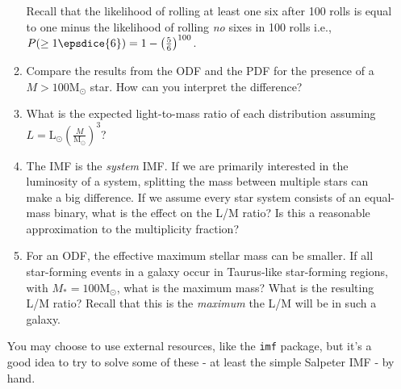 \documentclass{article}
\newcommand{\msun}{\ensuremath{\mathrm{M}_\odot}\xspace}
\newcommand{\lsun}{\ensuremath{\mathrm{L}_\odot}\xspace}
\begin{document}
\begin{enumerate}
\begin{enumerate}
            Recall that the likelihood of rolling at least one six after 100 rolls
            is equal to one minus the likelihood of rolling \emph{no} sixes in 100 rolls
            i.e., $P(\ge 1 \epsdice{6}) = 1- \left(\frac{5}{6}\right)^{100}$.
        \item Compare the results from the ODF and the PDF for the presence of
            a $M>100\msun$ star.  How can you interpret the difference?
        \item What is the expected light-to-mass ratio of each distribution
            assuming $L = \lsun \left(\frac{M}{\msun}\right)^{3}$?
        \item The IMF is the \emph{system} IMF.  If we are primarily interested
            in the luminosity of a system, splitting the mass between multiple
            stars can make a big difference.  If we assume every star system
            consists of an equal-mass binary, what is the effect on the L/M ratio?
            Is this a reasonable approximation to the multiplicity fraction?
        \item For an ODF, the effective maximum stellar mass can be smaller.
            If all star-forming events in a galaxy occur in Taurus-like
            star-forming regions, with $M_*=100\msun$, what is the maximum
            mass?  What is the resulting L/M ratio?  Recall that this is
            the \emph{maximum} the L/M will be in such a galaxy.
    \end{enumerate}

    You may choose to use external resources, like the \texttt{imf} package,
    but it's a good idea to try to solve some of these - at least the simple
    Salpeter IMF - by hand.

\end{enumerate}
\end{document}
